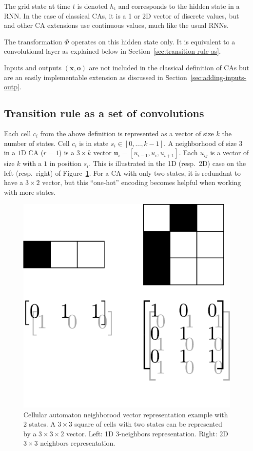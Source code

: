 The grid state at time $t$ is denoted $h_t$ and corresponds to the hidden state
in a RNN\@. In the case of classical CAs, it is a 1 or 2D vector of discrete
values, but~\parencite{mordvintsevGrowingNeuralCellular2020} and other CA
extensions use continuous values, much like the usual RNNs.

The transformation $\Phi$ operates on this hidden state only. It is equivalent
to a convolutional layer as explained below in
Section~\ref{sec:transition-rule-as}.

Inputs and outputs $(\mathbf{x}, \mathbf{o})$ are not included in the classical
definition of CAs but are an easily implementable extension as discussed in
Section~\ref{sec:adding-inputs-outp}.

\subsection{Transition rule as a set of convolutions\label{sec:transition-rule-as}}

Each cell $c_i$ from the above definition is represented as a vector of size $k$
the number of states. Cell $c_i$ is in state $s_i \in [0, \ldots, k - 1]$. A
neighborhood of size $3$ in a $1$D CA ($r=1$) is a $3 \times k$ vector
$\mathbf{u}_i = [u_{i-1}, u_{i}, u_{i+1}]$. Each $u_{ij}$ is a vector of size
$k$ with a $1$ in position $s_i$. This is illustrated in the 1D (resp.\ 2D) case
on the left (resp.\ right) of Figure~\ref{fig:cell}. For a CA with only two
states, it is redundant to have a $3\times 2$ vector, but this ``one-hot'' encoding
becomes helpful when working with more states.

\begin{figure}[htbp]
  \centering
  \includegraphics[width=.3\linewidth]{figures/repr}
  \caption{\label{fig:cell}Cellular automaton neighborood vector representation
    example with 2 states. A $3\times 3$ square of cells with two states can be
    represented by a $3\times 3 \times 2$ vector. Left: 1D 3-neighbors
    representation. Right: 2D $3\times3$ neighbors representation.}

\end{figure}

